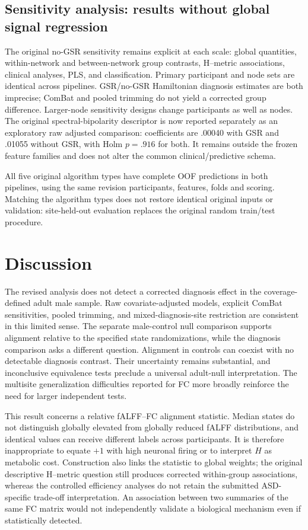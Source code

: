 \documentclass[10pt,letterpaper]{article}
\begin{document}


\subsection*{Sensitivity analysis: results without global signal regression}
The original no-GSR sensitivity remains explicit at each scale: global quantities,
within-network and between-network group contrasts, H--metric associations,
clinical analyses, PLS, and classification. Primary participant and node sets are
identical across pipelines. GSR/no-GSR Hamiltonian diagnosis estimates are both
imprecise; ComBat and pooled trimming do not yield a corrected group difference.
Larger-node sensitivity designs change participants as well as nodes.
The original spectral-bipolarity descriptor is now reported separately as an
exploratory raw adjusted comparison: coefficients are .00040 with GSR and .01055
without GSR, with Holm $p=.916$ for both. It remains outside the frozen feature
families and does not alter the common clinical/predictive schema.

All five original algorithm types have complete OOF predictions in both pipelines,
using the same revision participants, features, folds and scoring.
Matching the algorithm types does not restore identical original inputs or validation:
site-held-out evaluation replaces the original random train/test procedure.


\section*{Discussion}
The revised analysis does not detect a corrected diagnosis effect in the
coverage-defined adult male sample. Raw covariate-adjusted models, explicit
ComBat sensitivities, pooled trimming, and mixed-diagnosis-site restriction are
consistent in this limited sense. The separate male-control null comparison supports alignment relative to the
specified state randomizations, while the diagnosis comparison asks a different
question. Alignment in controls can coexist with no detectable diagnosis contrast.
Their uncertainty remains substantial, and
inconclusive equivalence tests preclude a universal adult-null interpretation.
The multisite generalization difficulties reported for FC more broadly
\cite{King2019revision} reinforce the need for larger independent tests.

This result concerns a relative fALFF--FC alignment statistic. Median states do
not distinguish globally elevated from globally reduced fALFF distributions,
and identical values can receive different labels across participants. It is
therefore inappropriate to equate $+1$ with high neuronal firing or to interpret
$H$ as metabolic cost. Construction also links the statistic to global weights;
the original descriptive H--metric question still produces corrected
within-group associations, whereas the controlled efficiency analyses do not
retain the submitted ASD-specific trade-off interpretation. An association between two summaries of the same FC matrix would
not independently validate a biological mechanism even if statistically detected.
\end{document}
